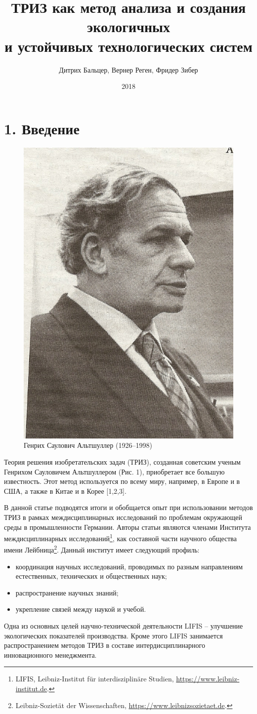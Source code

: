 \documentclass[11pt,a4paper]{article}
\title{ТРИЗ как метод анализа и создания экологичных\\ и устойчивых
  технологических систем}
\author{Дитрих Бальцер, Вернер Реген, Фридер Зибер}
\date{2018}
\begin{document}
\maketitle

\section*{1. Введение}
\begin{figure}\vspace*{-1em}
\includegraphics[width=.25\textwidth]{qvViZa.jpg}
\caption{Генрих Саулович Альтшуллер (1926--1998)}
\end{figure}
Теория решения изобретательских задач (ТРИЗ), созданная советским ученым
Генрихом Сауловичем Альтшуллером (Рис. 1), приобретает все большую
известность. Этот метод используется по всему миру, например, в Европе и в
США, а также в Китае и в Корее [1,2,3].

В данной статье подводятся итоги и обобщается опыт при использовании методов
ТРИЗ в рамках междисциплинарных исследований по проблемам окружающей среды в
промышленности Германии. Авторы статьи являются членами Института
междисциплинарных исследований\footnote{LIFIS, Leibniz-Institut für
  interdisziplinäre Studien, \url{https://www.leibniz-institut.de}.}, как
составной части научного общества имени Лейбница\footnote{Leibniz-Sozietät der
  Wissenschaften, \url{https://www.leibnizsozietaet.de}.}. Данный институт
имеет следующий профиль:
\begin{itemize}
\item координация научных исследований, проводимых по разным направлениям
  естественных, технических и общественных наук;
\item распространение научных знаний;
\item укрепление связей между наукой и учебой.
\end{itemize}
Одна из основных целей научно-технической деятельности LIFIS – улучшение
экологических показателей производства. Кроме этого LIFIS занимается
распространением методов ТРИЗ в составе интердисциплинарного инновационного
менеджмента.
\end{document}
